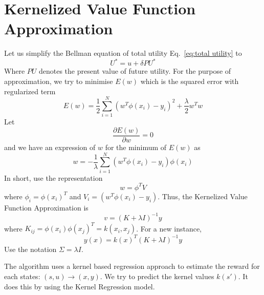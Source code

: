 \section{Kernelized Value Function Approximation}
Let us simplify the Bellman equation of total utility Eq.~\ref{eq:total utility} to
\begin{equation}
U^{*} = u + \delta PU^{*} 
\end{equation}
Where $PU$ denotes the present value of future utility. For the purpose of approximation, we try to minimise $E(w)$ which is the squared error with regularized term
\begin{equation}
E(w) = \frac{1}{2} \sum_{i=1}^{N}(w^{T}\phi(x_i)-y_i)^{2}+\frac{\lambda}{2}w^{T}w
\end{equation}
Let 
\begin{equation}
\frac{{\partial E(w)}}{{\partial w}} = 0
\end{equation}
and we have an expression of $w$ for the minimum of $E(w)$ as
\begin{equation}
w =  - \frac{1}{\lambda }\sum\limits_{i = 1}^N {({w^T}\phi ({x_i}) - {y_i})\phi ({x_i})}
\end{equation}
In short, use the representation
\begin{equation}
w=\phi^{T}V
\end{equation}
where $\phi_{i}=\phi(x_i)^{T}$ and $V_i=(w^{T}\phi(x_i)-y_i)$. Thus, the Kernelized Value Function Approximation \cite{gavintaylorronaldparr2009} is
\begin{equation}
v=(K+\lambda I)^{-1}y
\end{equation}
where $K_{ij}=\phi(x_i)\phi(x_j)^{T}=k(x_i,x_j)$. For a new instance,
\begin{equation}
y(x)=k(x)^{T}(K+\lambda I)^{-1}y
\end{equation}
Use the notation $\Sigma=\lambda I$.

The algorithm uses a kernel based regression approach to estimate the reward for each states: $(s,u) \rightarrow (x,y)$. We try to predict the kernel values $k(s')$. It does this by using the Kernel Regression model.

